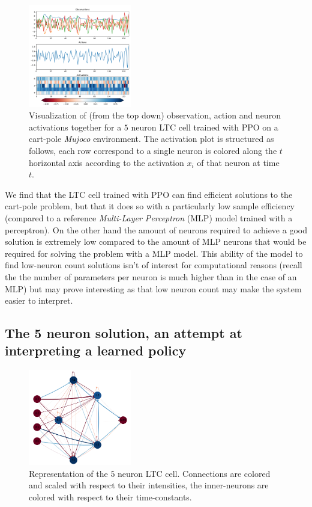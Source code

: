 \begin{figure}[h!]
    \centering
    \includegraphics[width=0.4\textwidth]{figures/5n_solution.pdf}
    \caption{Visualization of (from the top down) observation, action and neuron activations together for a $5$ neuron LTC cell trained with PPO on a cart-pole \textit{Mujoco} environment. The activation plot is structured as follows, each row correspond to a single neuron is colored along the $t$ horizontal axis according to the activation $x_i$ of that neuron at time $t$.}
    \label{fig:5n_episode}
\end{figure}

We find that the LTC cell trained with PPO can find efficient solutions to the cart-pole problem, but that it does so with a particularly low sample efficiency (compared to a reference \textit{Multi-Layer Perceptron} ({MLP}) model trained with a perceptron). On the other hand the amount of neurons required to achieve a good solution is extremely low compared to the amount of MLP neurons that would be required for solving the problem with a {MLP} model. This ability of the model to find low-neuron count solutions isn't of interest for computational reasons (recall the the number of parameters per neuron is much higher than in the case of an MLP) but may prove interesting as that low neuron count may make the system easier to interpret. 

\subsection{The 5 neuron solution, an attempt at interpreting a learned policy}
\label{sec:5-neurons}

\begin{figure}[h!]
    \centering
    \includegraphics[width=0.4\textwidth]{figures/5n_schematic.png}
    \caption{Representation of the $5$ neuron LTC cell. Connections are colored and scaled with respect to their intensities, the inner-neurons are colored with respect to their time-constants.}
    \label{fig:5n_schematic}
\end{figure}

